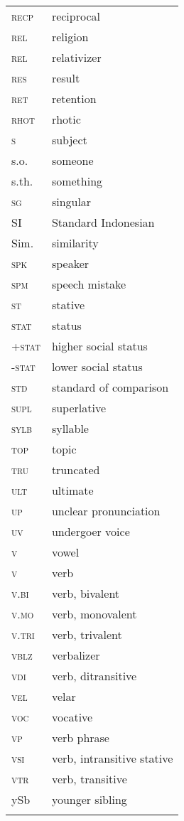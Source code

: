 \begin{tabularx}{.45\textwidth}{lX} 
\textsc{recp} & reciprocal\\
\textsc{rel} & religion\\
\textsc{rel} & {relativizer}\\
\textsc{res} & result\\
\textsc{ret} & retention\\
\textsc{rhot} & rhotic\\
\textsc{s} & subject\\
s.o. & someone\\
s.th. & something\\
\textsc{sg} & singular\\
SI & {Standard Indonesian}\\
Sim. & {similarity}\\
\textsc{spk} & speaker\\
\textsc{spm} & speech mistake\\
\textsc{st} & stative\\
\textsc{stat} & status\\
\textsc{+stat} & higher social status\\
\textsc{-stat} & lower social status\\
\textsc{std} & standard of comparison\\
\textsc{supl} & superlative\\
\textsc{sylb} & syllable\\
\textsc{top} & topic\\
\textsc{tru} & truncated\\
\textsc{ult} & ultimate\\
\textsc{up} & unclear pronunciation\\
\textsc{uv} & undergoer voice\\
\textsc{v} & vowel\\
\textsc{v} & {verb}\\
\textsc{v.bi} & {verb}, {bivalent}\\
\textsc{v.mo} & {verb}, {monovalent}\\
\textsc{v.tri} & {verb}, {trivalent}\\
\textsc{vblz} & verbalizer\\
\textsc{vdi} & {verb}, ditransitive\\
\textsc{vel} & velar\\
\textsc{voc} & vocative\\ 
\textsc{vp} & {verb} phrase\\
\textsc{vsi} & {verb}, intransitive stative\\
\textsc{vtr} & {verb}, transitive\\
ySb & younger sibling\\
\\
\end{tabularx} 
